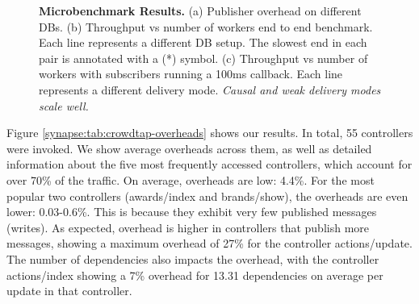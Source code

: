   \begin{figure}[t]
    \centering {} \hspace{0.1cm}  \hspace{0.1cm} 
    \vspace{-0.4cm}
    \caption{\small {\bf Microbenchmark Results.}
     (a) Publisher overhead on different DBs.
     (b) Throughput vs number of workers end to end benchmark.
         Each line represents a different DB setup.
         The slowest end in each pair is annotated with a (*) symbol.
     (c) Throughput vs number of workers with subscribers running a 100ms callback.
         Each line represents a different delivery mode.
         {\em Causal and weak delivery modes scale well.}
     \vspace{-15pt} }
   \end{figure}

Figure \ref{synapse:tab:crowdtap-overheads} shows our results. In total, 55 controllers
were invoked. We show average overheads across them, as well as detailed
information about the five most frequently accessed controllers, which account
for over 70\% of the traffic. On average, \synapse overheads are low: 4.4\%.
For the most popular two controllers ({\code awards/index} and {\code
brands/show}), the overheads are even lower: 0.03-0.6\%. This is because they
exhibit very few published messages (writes). As expected, \synapse overhead
is higher in controllers that publish more messages, showing a maximum overhead
of 27\% for the controller {\code actions/update}. The number of dependencies also
impacts the overhead, with the controller {\code actions/index} showing a 7\%
overhead for 13.31 dependencies on average per update in that controller.

